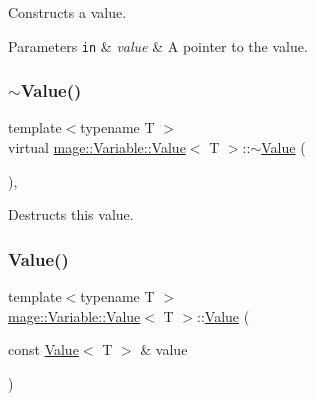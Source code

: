 Constructs a value.


\begin{DoxyParams}[1]{Parameters}
\mbox{\tt in}  & {\em value} & A pointer to the value. \\
\hline
\end{DoxyParams}
\hypertarget{structmage_1_1_variable_1_1_value_ab77eb80d4786a060778dc41ee73c1371}{}\label{structmage_1_1_variable_1_1_value_ab77eb80d4786a060778dc41ee73c1371} 
\subsubsection{\texorpdfstring{$\sim$\+Value()}{~Value()}}
{\footnotesize\ttfamily template$<$typename T $>$ \\
virtual \hyperlink{structmage_1_1_variable_1_1_value}{mage\+::\+Variable\+::\+Value}$<$ T $>$\+::$\sim$\hyperlink{structmage_1_1_variable_1_1_value}{Value} (\begin{DoxyParamCaption}{ }\end{DoxyParamCaption})\hspace{0.3cm}{\ttfamily [virtual]}, {\ttfamily [default]}}

Destructs this value. \hypertarget{structmage_1_1_variable_1_1_value_a083583e9c9c59eae659db2bfdf4b6629}{}\label{structmage_1_1_variable_1_1_value_a083583e9c9c59eae659db2bfdf4b6629} 
\subsubsection{\texorpdfstring{Value()}{Value()}\hspace{0.1cm}{\footnotesize\ttfamily [2/3]}}
{\footnotesize\ttfamily template$<$typename T $>$ \\
\hyperlink{structmage_1_1_variable_1_1_value}{mage\+::\+Variable\+::\+Value}$<$ T $>$\+::\hyperlink{structmage_1_1_variable_1_1_value}{Value} (\begin{DoxyParamCaption}\item[{const \hyperlink{structmage_1_1_variable_1_1_value}{Value}$<$ T $>$ \&}]{value }\end{DoxyParamCaption})\hspace{0.3cm}{\ttfamily [private]}}

